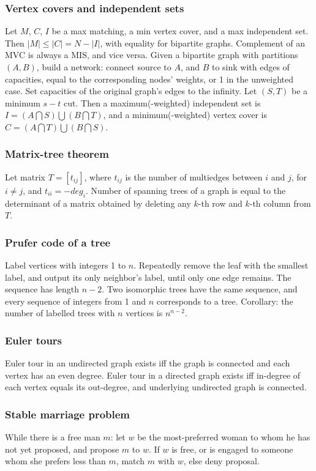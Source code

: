 \documentclass[a4paper,13pt]{article}
\begin{document}
\subsubsection{Vertex covers and independent sets}
Let $M$, $C$, $I$ be a max matching, a min vertex cover, and a max independent set. Then $|M| \leq |C| = N - |I|$, with equality for bipartite graphs. Complement of an MVC is always a MIS, and vice versa.
Given a bipartite graph with partitions $(A,B)$, build a network: connect source to $A$, and $B$ to sink with edges of capacities, equal to the corresponding nodes’ weights, or 1 in the unweighted case.
Set capacities of the original graph’s edges to the infinity. Let $(S,T)$ be a minimum $s-t$ cut. 
Then a maximum(-weighted) independent set is $I = (A \bigcap S) \bigcup (B \bigcap T)$, and a minimum(-weighted) vertex cover is $C = (A \bigcap T) \bigcup (B \bigcap S)$.

\subsubsection{Matrix-tree theorem}
Let matrix $T = [t_{ij}]$, where $t_{ij}$ is the number of multiedges between $i$ and $j$, for $i \neq j$, and $t_{ii} = -deg_i$.
Number of spanning trees of a graph is equal to the determinant of a matrix obtained by deleting any $k$-th row and $k$-th column from $T$.

\subsubsection{Prufer code of a tree}
Label vertices with integers 1 to $n$. Repeatedly remove the leaf with the smallest label, and output its only neighbor’s label, until only one edge remains. The sequence has length $n - 2$.
Two isomorphic trees have the same sequence, and every sequence of integers from 1 and $n$ corresponds to a tree. Corollary: the number of labelled trees with $n$ vertices is $n^{n-2}$.

\subsubsection{Euler tours}
Euler tour in an undirected graph exists iff the graph is connected and each vertex has an even degree. Euler tour in a directed graph exists iff in-degree of each vertex equals its out-degree, and underlying undirected graph is connected.

\subsubsection{Stable marriage problem}
While there is a free man $m$: let $w$ be the most-preferred woman to whom he has not yet proposed, and propose $m$ to $w$. If $w$ is free, or is engaged to someone whom she prefers less than $m$, match $m$ with $w$, else deny proposal.
\end{document}
